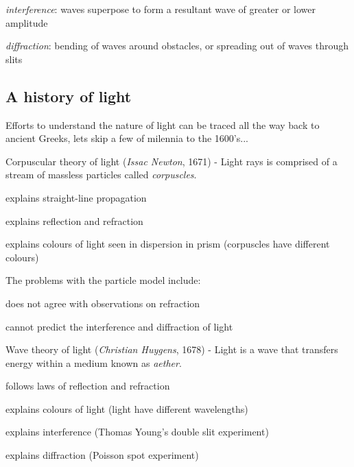 \documentclass[a4paper,12pt]{book}
\begin{document}
\begin{compactenum}
	\item[-] \emph{interference}: waves superpose to form a resultant wave of greater or lower amplitude
	
	\item[-] \emph{diffraction}: bending of waves around obstacles, or spreading out of waves through slits
\end{compactenum}

\subsection{A history of light}

Efforts to understand the nature of light can be traced all the way back to ancient Greeks, lets skip a few of milennia to the 1600's...

Corpuscular theory of light (\emph{Issac Newton}, 1671) - Light rays is comprised of a stream of massless particles called \emph{corpuscles}.

\begin{compactitem}
	\item[--] explains straight-line propagation
	
	\item[--] explains reflection and refraction
	
	\item[--] explains colours of light seen in dispersion in prism (corpuscles have different colours)
\end{compactitem}

The problems with the particle model include:

\begin{compactitem}
	\item[--] does not agree with observations on refraction
	
	\item[--] cannot predict the interference and diffraction of light
\end{compactitem}

Wave theory of light (\emph{Christian Huygens}, 1678) - Light is a wave that transfers energy within a medium known as \emph{aether}.

\begin{compactitem}
	\item[--] follows laws of reflection and refraction
	
	\item[--] explains colours of light (light have different wavelengths)
	
	\item[--] explains interference (Thomas Young's double slit experiment)
	
	\item[--] explains diffraction (Poisson spot experiment)
\end{compactitem}
\end{document}
